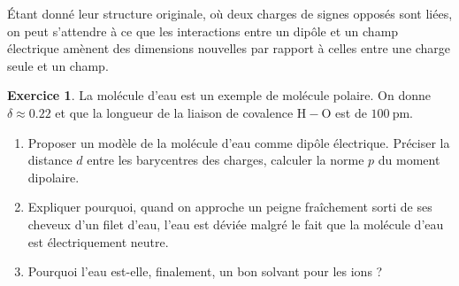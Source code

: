 \documentclass{article}
\theoremstyle{definition}
\newtheorem{exo}{Exercice}
\theoremstyle{remark}
\begin{document}
Étant donné leur structure originale, où deux charges de signes opposés sont liées, on peut s'attendre à ce que les interactions entre un dipôle et un champ électrique amènent des dimensions nouvelles par rapport à celles entre une charge seule et un champ.

\begin{exo}
	La molécule d'eau est un exemple de molécule polaire. On donne $\delta\approx\num{0.22}$ et que la longueur de la liaison de covalence $\mathrm{H}-\mathrm{O}$ est de $\SI{100}{\pico\meter}$.
	\begin{enumerate}
		\item Proposer un modèle de la molécule d'eau comme dipôle électrique. Préciser la distance $d$ entre les barycentres des charges, calculer la norme $p$ du moment dipolaire.
		\item Expliquer pourquoi, quand on approche un peigne fraîchement sorti de ses cheveux d'un filet d'eau, l'eau est déviée malgré le fait que la molécule d'eau est électriquement neutre.
		\item Pourquoi l'eau est-elle, finalement, un bon solvant pour les ions ?
	\end{enumerate}
\end{exo}
\end{document}
